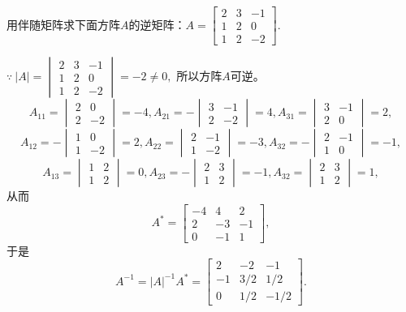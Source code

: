 \begin{eg}
用伴随矩阵求下面方阵$A$的逆矩阵：$A = \begin{bmatrix} 2 & 3 & -1 \\ 1 & 2 & 0 \\ 1 & 2 & -2 \end{bmatrix}.$
\end{eg}

\begin{solution}
$\because \ |A| = \begin{vmatrix} 2 & 3 & -1 \\ 1 & 2 & 0 \\ 1 & 2 & -2 \end{vmatrix} = -2 \neq 0,$ 所以方阵$A$可逆。
$$A_{11} = \begin{vmatrix} 2 & 0 \\ 2 & -2 \end{vmatrix} = -4, A_{21} = -\begin{vmatrix} 3 & -1 \\ 2 & -2 \end{vmatrix} = 4, A_{31} = \begin{vmatrix} 3 & -1 \\ 2 & 0 \end{vmatrix} = 2,$$
$$A_{12} = -\begin{vmatrix} 1 & 0 \\ 1 & -2 \end{vmatrix} = 2, A_{22} = \begin{vmatrix} 2 & -1 \\ 1 & -2 \end{vmatrix} = -3, A_{32} = -\begin{vmatrix} 2 & -1 \\ 1 & 0 \end{vmatrix} = -1,$$
$$A_{13} = \begin{vmatrix} 1 & 2 \\ 1 & 2 \end{vmatrix} = 0, A_{23} = -\begin{vmatrix} 2 & 3 \\ 1 & 2 \end{vmatrix} = -1, A_{32} = \begin{vmatrix} 2 & 3 \\ 1 & 2 \end{vmatrix} = 1,$$
从而
$$A^{\ast} = \begin{bmatrix} -4 & 4 & 2 \\ 2 & -3 & -1 \\ 0 & -1 & 1 \end{bmatrix},$$
于是
$$A^{-1} = |A|^{-1}A^{\ast} = \begin{bmatrix} 2 & -2 & -1 \\ -1 & 3/2 & 1/2 \\ 0 & 1/2 & -1/2 \end{bmatrix}.$$
\end{solution}

